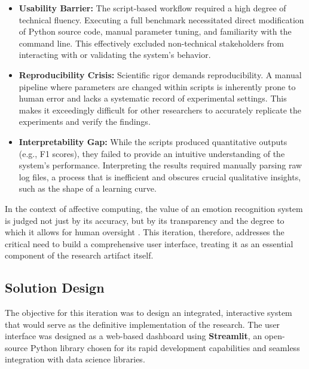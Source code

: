 \begin{itemize}
    \item \textbf{Usability Barrier:} The script-based workflow required a high degree of technical fluency. Executing a full benchmark necessitated direct modification of Python source code, manual parameter tuning, and familiarity with the command line. This effectively excluded non-technical stakeholders from interacting with or validating the system's behavior.
    
    \item \textbf{Reproducibility Crisis:} Scientific rigor demands reproducibility. A manual pipeline where parameters are changed within scripts is inherently prone to human error and lacks a systematic record of experimental settings. This makes it exceedingly difficult for other researchers to accurately replicate the experiments and verify the findings.
    
    \item \textbf{Interpretability Gap:} While the scripts produced quantitative outputs (e.g., F1 scores), they failed to provide an intuitive understanding of the system's performance. Interpreting the results required manually parsing raw log files, a process that is inefficient and obscures crucial qualitative insights, such as the shape of a learning curve.
\end{itemize}

In the context of affective computing, the value of an emotion recognition system is judged not just by its accuracy, but by its transparency and the degree to which it allows for human oversight \cite{zhou2023emotional, hirschberg2015advances}. This iteration, therefore, addresses the critical need to build a comprehensive user interface, treating it as an essential component of the research artifact itself.

\subsection{Solution Design}
\label{subsec:solution_design}

The objective for this iteration was to design an integrated, interactive system that would serve as the definitive implementation of the research. The user interface was designed as a web-based dashboard using \textbf{Streamlit}, an open-source Python library chosen for its rapid development capabilities and seamless integration with data science libraries.

